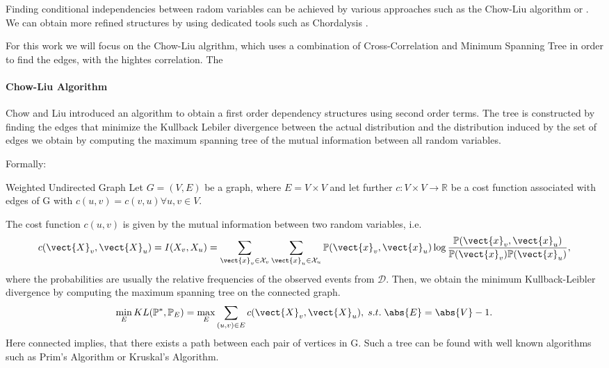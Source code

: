 Finding conditional independencies between radom variables can be achieved by various approaches such as the Chow-Liu algorithm or . 
We can obtain more refined structures by using dedicated tools such as Chordalysis .

For this work we will focus on the Chow-Liu algrithm, which uses a combination of Cross-Correlation and Minimum Spanning Tree in order to find the edges, with the hightes correlation.
The 

\paragraph*{Chow-Liu Algorithm}
Chow and Liu introduced an algorithm\cite{chow1968approximating} to obtain a first order dependency structures using second order terms.
The tree is constructed by finding the edges that minimize the Kullback Lebiler divergence between the actual distribution and the distribution induced by the set of edges we obtain by computing the maximum spanning tree of the mutual information between all random variables.

Formally:
\begin{definition}{Weighted Undirected Graph}
    Let $G=(V,E)$ be a graph, where $E = V \times V$ and let further $c: V \times V \rightarrow \mathbb{R}$ be a cost function associated with edges of G with $c(u,v) = c(v,u) \forall u,v \in V$.
\end{definition}

    The cost function $c(u,v)$ is given by the mutual information between two random variables, i.e. 
    \begin{equation}
        c(\vect{X}_v, \vect{X}_u) = I(X_v, X_u) = \sum_{\vect{x}_v \in \mathcal{X}_v} \sum_{\vect{x}_u \in \mathcal{X}_u} \mathbb{P}(\vect{x}_v,\vect{x}_u) \log \frac{\mathbb{P}(\vect{x}_v,\vect{x}_u) }{\mathbb{P}(\vect{x}_v)  \mathbb{P}(\vect{x}_u)},
    \end{equation}
    where the probabilities are usually the relative frequencies of the observed events from $\mathcal{D}$.
    Then, we obtain the minimum Kullback-Leibler divergence by computing the maximum spanning tree on the  connected graph.
    \begin{equation}
        \min_{E} KL(\mathbb{P}^*, \mathbb{P}_{E}) = \max_{E} \sum_{(u,v) \in E} c(\vect{X}_v, \vect{X}_u), \; s.t. \; \abs{E} = \abs{V}-1 .
    \end{equation}
    Here connected implies, that there exists a path between each pair of vertices in G. Such a tree can be found with well known algorithms such as Prim's Algorithm or Kruskal's Algorithm.


